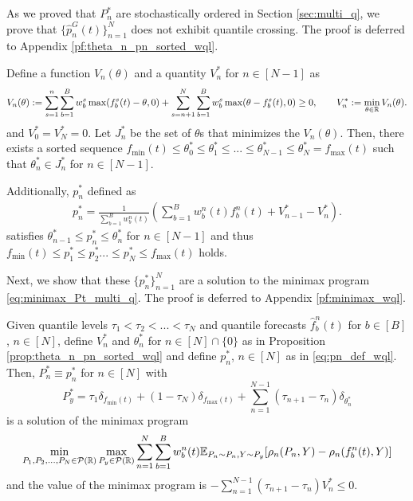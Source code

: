 As we proved that $P_n^*$ are stochastically ordered in Section \ref{sec:multi_q}, we prove that $\{\hat{p}^G_n(t)\}_{n=1}^N$ does not exhibit quantile crossing. The proof is deferred to Appendix \ref{pf:theta_n_pn_sorted_wql}.
\begin{prop}\label{prop:theta_n_pn_sorted_wql}
Define a function $V_n(\theta)$ and a quantity $V_n^*$ for $n \in [N-1]$ as
\begin{align*}
    V_n(\theta) := \sum_{s=1}^{n} \sum_{b=1}^B w_b^s \max(f_b^s(t)-\theta, 0) + \sum_{s=n+1}^{N}\sum_{b=1}^B  w_b^s \max(\theta - f_b^s(t), 0) \geq 0, \qquad V_n^* := \min_{\theta \in \mathbb{R}} V_n(\theta).    
\end{align*}
and $V_0^* = V_N^* = 0$. Let $J_n^*$ be the set of $\theta$s that minimizes the $V_n(\theta)$. Then, there exists a sorted sequence $f_\text{min}(t) \leq \theta_0^* \leq \theta_1^* \leq ... \leq \theta_{N-1}^* \leq \theta_N^* = f_\text{max}(t)$ such that $\theta_n^* \in J_n^*$ for $n \in [N-1]$.
\smallskip

Additionally, $p_n^*$ defined as 
\begin{align} \label{eq:pn_def_wql}
p_n^* = \frac{1}{\sum_{b=1}^B w_b^n(t)} \left( \sum_{b=1}^B w_b^n(t) f_b^n(t) + V_{n-1}^* - V_n^*  \right).
\end{align}
satisfies $\theta_{n-1}^* \leq p_n^* \leq \theta_n^*$ for $n \in [N-1]$ and thus $f_\text{min}(t) \leq p_1^* \leq p_2^* ... \leq p_N^* \leq f_\text{max}(t)$ holds.
\end{prop}

  


Next, we show that these $\{p_n^*\}_{n=1}^N$ are a solution to the minimax program \eqref{eq:minimax_Pt_multi_q}. The proof is deferred to Appendix \ref{pf:minimax_wql}.
\begin{theorem}\label{thm:minimax_wql}
    Given quantile levels $\tau_1 < \tau_2 < ... < \tau_N$ and quantile forecasts $\hat{f}_b^n(t)$ for $b \in [B]$, $n \in [N]$, define $V_n^*$ and $\theta_n^*$ for $n \in [N]\cap\{0\}$ as in Proposition \ref{prop:theta_n_pn_sorted_wql} and define $p_n^*$, $n \in [N]$ as in \eqref{eq:pn_def_wql}. Then, $P_n^* \equiv p_n^*$ for $n \in [N]$ with 
    \[
    P_y^* = \tau_1 \delta_{f_\text{min}(t)} + (1-\tau_N)\delta_{f_\text{max}(t)} + \sum_{n=1}^{N-1}(\tau_{n+1}-\tau_n)\delta_{\theta_n^*}
    \]
    is a solution of the minimax program 
    \[
    \min_{P_1, P_2, ..., P_N \in \mathcal{P}(\mathbb{R})} \max_{P_y \in \mathcal{P}(\mathbb{R})} \sum_{n=1}^N \sum_{b=1}^B w_b^n(t) \mathbb{E}_{P_n \sim P_n, Y \sim P_y} [\rho_n(P_n, Y) - \rho_n(f_b^n(t), Y)]
    \]
    and the value of the minimax program is 
    \(
    -\sum_{n=1}^{N-1}(\tau_{n+1}-\tau_n) V_n^* \leq 0.
    \)
\end{theorem}



